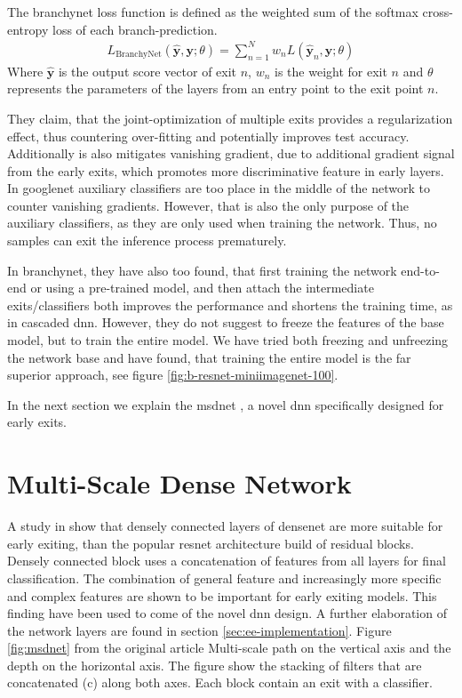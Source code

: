 The \gls{branchynet} loss function is defined as the weighted sum of the softmax cross-entropy loss of each branch-prediction. 
\begin{align}
	L_{\mathrm{BranchyNet}}(\hat{\mathbf{y}},\mathbf{y};\theta) = \sum_{n=1}^{N} w_n L \left(\hat{\mathbf{y}}_{n},\mathbf{y};\theta\right)
\end{align}
Where $ \bm{\hat{y}} $ is the output score vector of exit $ n $, $ w_n $ is the weight for exit $ n $ and $ \theta $ represents the parameters of the layers from an entry point to the exit point $ n $.

They claim, that the joint-optimization of multiple exits provides a regularization effect, thus countering over-fitting and potentially improves test accuracy. Additionally is also mitigates vanishing gradient, due to additional gradient signal from the early exits, which promotes more discriminative feature in early layers. In \gls{googlenet} \cite{szegedy_going_2015} auxiliary classifiers are too place in the middle of the network to counter vanishing gradients. However, that is also the only purpose of the auxiliary classifiers, as they are only used when training the network. Thus, no samples can exit the inference process prematurely. 

In \gls{branchynet}, they have also too found, that first training the network end-to-end or using a pre-trained model, and then attach the intermediate exits/classifiers both improves the performance and shortens the training time, as in cascaded \gls{dnn}. However, they do not suggest to freeze the features of the base model, but to train the entire model. We have tried both freezing and unfreezing the network base and have found, that training the entire model is the far superior approach, see figure \ref{fig:b-resnet-miniimagenet-100}. 

In the next section we explain the \gls{msdnet} \cite{huang_multi-scale_2017}, a novel \gls{dnn} specifically designed for early exits.

\section{Multi-Scale Dense Network}

A study in \cite{huang_densely_2016} show that densely connected layers of \gls{densenet} are more suitable for early exiting, than the popular \gls{resnet} architecture build of residual blocks. Densely connected block uses a concatenation of features from all layers for final classification. The combination of  general feature and increasingly more specific and complex features are shown to be important for early exiting models. This finding have been used to come of the novel \gls{dnn} design. A further elaboration of the network layers are found in section \ref{sec:ee-implementation}. Figure \ref{fig:msdnet} from the original article Multi-scale path on the vertical axis and the depth on the horizontal axis. The figure show the stacking of filters that are concatenated (c) along both axes. Each block contain an exit with a classifier.

